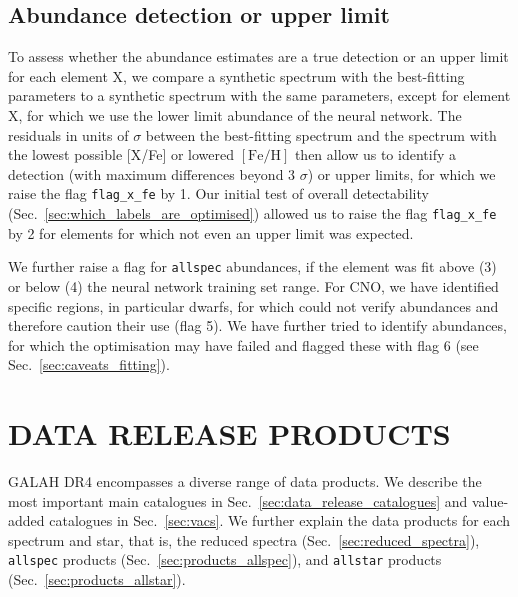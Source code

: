 \documentclass[
  journal=pasa,
  manuscript=research-paper, %
  year=2024,
  volume=37
]{cup-journal}
\newcommand{\feh}{$\mathrm{[Fe/H]}$\xspace}
\begin{document}
\subsection{Abundance detection or upper limit}
\label{sec:abundance_detection_or_upper_limit}

To assess whether the abundance estimates are a true detection or an upper limit for each element X, we compare a synthetic spectrum with the best-fitting parameters to a synthetic spectrum with the same parameters, except for element X, for which we use the lower limit abundance of the neural network. The residuals in units of $\sigma$ between the best-fitting spectrum and the spectrum with the lowest possible [X/Fe] or lowered \feh then allow us to identify a detection (with maximum differences beyond 3 $\sigma$) or upper limits, for which we raise the flag \texttt{flag\_x\_fe} by 1. Our initial test of overall detectability (Sec.~\ref{sec:which_labels_are_optimised}) allowed us to raise the flag \texttt{flag\_x\_fe} by 2 for elements for which not even an upper limit was expected.

We further raise a flag for \texttt{allspec} abundances, if the element was fit above (3) or below (4) the neural network training set range. For CNO, we have identified specific regions, in particular dwarfs, for which could not verify abundances and therefore caution their use (flag 5). We have further tried to identify abundances, for which the optimisation may have failed and flagged these with flag 6 (see Sec.~\ref{sec:caveats_fitting}).

\section{DATA RELEASE PRODUCTS}
\label{sec:catalogues_release_products}

GALAH DR4 encompasses a diverse range of data products. We describe the most important main catalogues in Sec.~\ref{sec:data_release_catalogues} and value-added catalogues in Sec.~\ref{sec:vacs}. We further explain the data products for each spectrum and star, that is, the reduced spectra (Sec.~\ref{sec:reduced_spectra}), \texttt{allspec} products (Sec.~\ref{sec:products_allspec}), and \texttt{allstar} products (Sec.~\ref{sec:products_allstar}).
\end{document}
